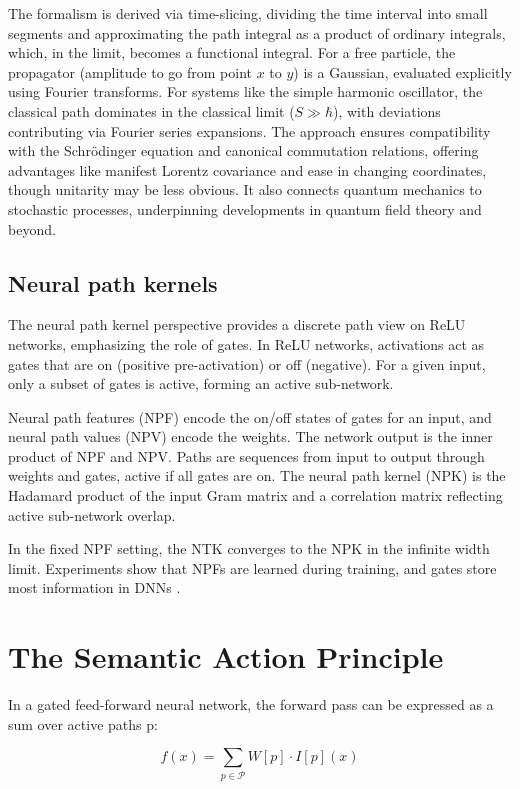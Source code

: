 \documentclass[11pt]{article}
\newcommand{\calP}{\mathcal{P}}
\begin{document}
The formalism is derived via time-slicing, dividing the time interval into small segments and approximating the path integral as a product of ordinary integrals, which, in the limit, becomes a functional integral. For a free particle, the propagator (amplitude to go from point \(x\) to \(y\)) is a Gaussian, evaluated explicitly using Fourier transforms. For systems like the simple harmonic oscillator, the classical path dominates in the classical limit (\(S \gg \hbar\)), with deviations contributing via Fourier series expansions. The approach ensures compatibility with the Schrödinger equation and canonical commutation relations, offering advantages like manifest Lorentz covariance and ease in changing coordinates, though unitarity may be less obvious. It also connects quantum mechanics to stochastic processes, underpinning developments in quantum field theory and beyond.

\subsection{Neural path kernels}
The neural path kernel perspective provides a discrete path view on ReLU networks, emphasizing the role of gates. In ReLU networks, activations act as gates that are on (positive pre-activation) or off (negative). For a given input, only a subset of gates is active, forming an active sub-network.

Neural path features (NPF) encode the on/off states of gates for an input, and neural path values (NPV) encode the weights. The network output is the inner product of NPF and NPV. Paths are sequences from input to output through weights and gates, active if all gates are on. The neural path kernel (NPK) is the Hadamard product of the input Gram matrix and a correlation matrix reflecting active sub-network overlap.

In the fixed NPF setting, the NTK converges to the NPK in the infinite width limit. Experiments show that NPFs are learned during training, and gates store most information in DNNs \cite{lakshminarayanan2020neural, pilanci2023path}.

\section{The Semantic Action Principle}
In a gated feed-forward neural network, the forward pass can be expressed as a sum over active paths p:

\[ f(x) = \sum_{p \in \calP} W[p] \cdot I[p](x) \]
\end{document}
